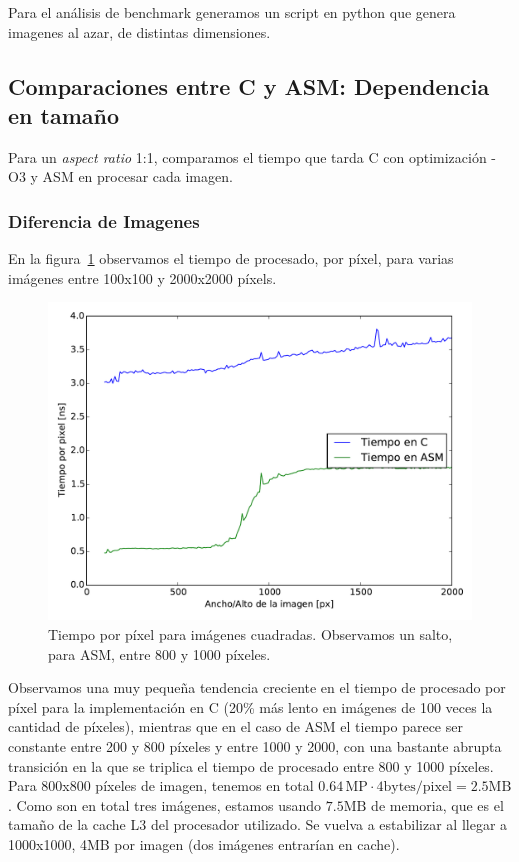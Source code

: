 Para el análisis de benchmark generamos un script en {\ttfamily
  python} que genera imagenes al azar, de distintas dimensiones.

\subsection{Comparaciones entre C y ASM: Dependencia en tamaño}

Para un \emph{aspect ratio} 1:1, comparamos el tiempo que tarda C con
optimización -O3 y ASM en procesar cada imagen.

\subsubsection{Diferencia de Imagenes}

En la figura~\ref{fig:tiempo_diff} observamos el tiempo de
procesado, por píxel, para varias imágenes entre 100x100 y 2000x2000
píxels. 

\begin{figure}
  \centering
  \includegraphics[width=0.7\columnwidth]{tiempo_diff.pdf}
  \caption{Tiempo por píxel para imágenes cuadradas. Observamos un
    salto, para ASM, entre 800 y 1000 píxeles.}
  \label{fig:tiempo_diff}
\end{figure}

Observamos una muy pequeña tendencia creciente en el tiempo de
procesado por píxel para la implementación en C (20\% más lento en
imágenes de 100 veces la cantidad de píxeles), mientras que en el caso
de ASM el tiempo parece ser constante entre 200 y 800 píxeles y entre
1000 y 2000, con una bastante abrupta transición en la que se triplica
el tiempo de procesado entre 800 y 1000 píxeles. Para 800x800 píxeles de
imagen, tenemos en total
$0.64\,\text{MP} \cdot 4\text{bytes/pixel} = 2.5\text{MB}$. Como son en
total tres imágenes, estamos usando $7.5\text{MB}$ de memoria, que es
el tamaño de la cache L3 del procesador utilizado. Se vuelva a
estabilizar al llegar a 1000x1000, 4MB por imagen (dos imágenes
entrarían en cache).

